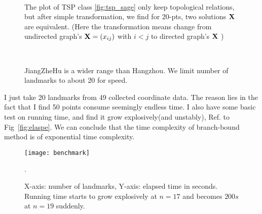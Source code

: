 \documentclass{mcmthesis}
\begin{document}
\begin{figure}
	\centering
	 \quad  
	  \quad
	\\
	  \quad 
	\caption[Results]{The plot  of  TSP class \vref{fig:tsp_sage} only keep topological relations, but after simple transformation, we find for 20-pts, two solutions $\mathbf{X}$ are equivalent. (Here the transformation means change from undirected graph's $\mathbf{X}=(x_{ij})$ with $i < j$  to directed graph's $\mathbf{X}$ ) } 
\end{figure}
\begin{figure}
	\centering
	 \   
	\caption[Results]{JiangZheHu is a wider range than Hangzhou. We limit number of landmarks to about 20 for speed.} 
\end{figure}

I just take 20 landmarks from 49 collected coordinate data. The reason lies in  the fact that I find 50 points consume seemingly endless time. I also have some basic test on running time, and find it grow explosively(and unstably), Ref. to Fig~\vref{fig:elaspe}. We can conclude that the time complexity of  branch-bound method is of  exponential time complexity.

\begin{figure}[h]
	\centering
	\texttt{[image: benchmark]}
	\caption[Running time]{X-axis: number of landmarks, Y-axis: elapsed time in seconds. Running time starts to grow explosively at $n=17$ and becomes $200s$  at  $n=19$  suddenly.}
	\label{fig:elaspe}.
\end{figure}
		
\end{document}
